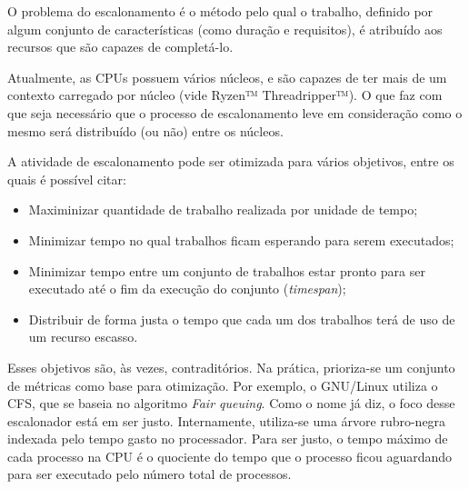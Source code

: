 

O problema do escalonamento é o método pelo qual o trabalho, definido por algum conjunto de características (como duração e requisitos), é atribuído aos recursos que são capazes de completá-lo. %

Atualmente, as \acrshort{CPU}s possuem vários núcleos, e são capazes de ter mais de um contexto carregado por núcleo (vide Ryzen™ Threadripper™\cite{Ryzen}). O que faz com que seja necessário que o processo de escalonamento leve em consideração como o mesmo será distribuído (ou não) entre os núcleos.

A atividade de escalonamento pode ser otimizada para vários objetivos, entre os quais é possível citar\cite{TANEMBAUM_SO}:
\begin{itemize}
	\item Maximinizar quantidade de trabalho realizada por unidade de tempo;
	\item Minimizar tempo no qual trabalhos ficam esperando para serem executados;
	\item Minimizar tempo entre um conjunto de trabalhos estar pronto para ser executado até o fim da execução do conjunto (\textit{timespan});
	\item Distribuir de forma justa o tempo que cada um dos trabalhos terá de uso de um recurso escasso.
\end{itemize}

Esses objetivos são, às vezes, contraditórios. Na prática, prioriza-se um conjunto de métricas como base para otimização. Por exemplo, o GNU/Linux utiliza o \acrfull{CFS}, que se baseia no algoritmo \textit{Fair queuing}. Como o nome já diz, o foco desse escalonador está em ser justo. Internamente, utiliza-se uma árvore rubro-negra indexada pelo tempo gasto no processador. Para ser justo, o tempo máximo de cada processo na \acrshort{CPU} é o quociente do tempo que o processo ficou aguardando para ser executado pelo número total de processos.

